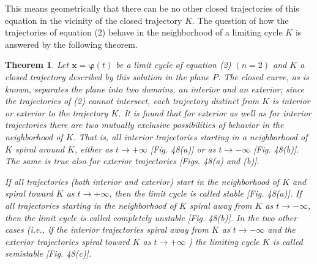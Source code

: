 \documentclass[10pt,a5paper]{book}
\theoremstyle{plain}
\newtheorem{theorem}{Theorem}
\theoremstyle{definition}
\theoremstyle{remark}
\begin{document}
This means geometrically that there can be no other closed trajectories of this equation in the vicinity of the closed trajectory $K$. The question of how the trajectories of equation (2) behave in the neighborhood of a limiting cycle $K$ is answered by the following theorem.

\begin{theorem}
Let $\mathbf{x}=\boldsymbol{\varphi}(t)$ be a limit cycle of equation (2) $(n=2)$ and $K$ a closed trajectory described by this solution in the plane $P$. The closed curve, as is known, separates the plane into two domains, an interior and an exterior; since the trajectories of (2) cannot intersect, each trajectory distinct from $K$ is interior or exterior to the trajectory $K$. It is found that for exterior as well as for interior trajectories there are two mutually exclusive possibilities of behavior in the neighborhood of $K$. That is, all interior trajectories starting in a neighborhood of $K$ spiral around $K$, either as $t \rightarrow+\infty$ [Fig. 48(a)] or as $t \rightarrow-\infty$ [Fig. 48(b)]. The same is true also for exterior trajectories [Figs. 48(a) and (b)].

If all trajectories (both interior and exterior) start in the neighborhood of $K$ and spiral toward $K$ as $t \rightarrow+\infty$, then the limit cycle is called stable [Fig. 48(a)]. If all trajectories starting in the neighborhood of $K$ spiral away from $K$ as $t \rightarrow-\infty$, then the limit cycle is called completely unstable [Fig. 48(b)]. In the two other cases (i.e., if the interior trajectories spiral away from $K$ as $t \rightarrow-\infty$ and the exterior trajectories spiral toward $K$ as $t \rightarrow+\infty$ ) the limiting cycle $K$ is called semistable [Fig. 48(c)].
\end{theorem}
\end{document}
